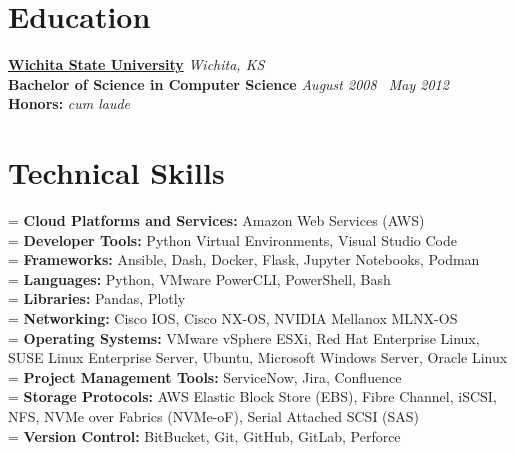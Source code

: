 \documentclass[10pt]{article}       %
\begin{document}
\vspace{-16.5pt}


\section*{Education}
\textbf{\href{https://www.wichita.edu}{Wichita State University}} \hfill \textit{Wichita, KS} \\
\vspace{1pt}
\textbf{Bachelor of Science in Computer Science} \hfill \textit{August 2008 \textendash\ May 2012} \\
\vspace{1pt}
\textbf{Honors:} \textit{cum laude} \\



\vspace{-10pt}

\section*{Technical Skills}
\newlength{\mylength}
\setlength{\mylength}{9.25em}

\hangindent=\mylength
\textbf{Cloud Platforms and Services:} Amazon Web Services (AWS) \\
\hangindent=\mylength
\textbf{Developer Tools:} Python Virtual Environments, Visual Studio Code \\
\hangindent=\mylength
\textbf{Frameworks:} Ansible, Dash, Docker, Flask, Jupyter Notebooks, Podman \\
\hangindent=\mylength
\textbf{Languages:} Python, VMware PowerCLI, PowerShell, Bash \\
\hangindent=\mylength
\textbf{Libraries:} Pandas, Plotly \\
\hangindent=\mylength
\textbf{Networking:} Cisco IOS, Cisco NX-OS, NVIDIA Mellanox MLNX-OS \\
\hangindent=\mylength
\textbf{Operating Systems:} VMware vSphere ESXi, Red Hat Enterprise Linux, SUSE Linux Enterprise Server, Ubuntu, Microsoft Windows Server, Oracle Linux \\
\hangindent=\mylength
\textbf{Project Management Tools:} ServiceNow, Jira, Confluence \\
\hangindent=\mylength
\textbf{Storage Protocols:} AWS Elastic Block Store (EBS), Fibre Channel, iSCSI, NFS, NVMe over Fabrics (NVMe-oF), Serial Attached SCSI (SAS) \\
\hangindent=\mylength
\textbf{Version Control:} BitBucket, Git, GitHub, GitLab, Perforce
\end{document}
